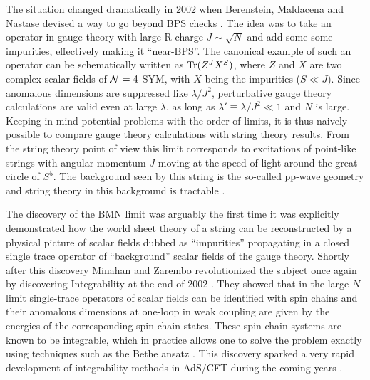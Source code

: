 The situation changed dramatically in 2002 when Berenstein, Maldacena and Nastase devised a way to go beyond BPS checks \cite{Berenstein:2002jq}. 
The idea was to take an operator in gauge theory with large R-charge $J \sim \sqrt{N}$ and add some some impurities, effectively making it ``near-BPS''.
The canonical example of such an operator can be schematically written as $\mathrm{Tr}(Z^J X^S)$, where $Z$ and $X$ are two complex scalar fields of $\mathcal{N}=4$ SYM, with $X$ being the impurities ($S \ll J$).
Since anomalous dimensions are suppressed like $\lambda/J^2$, perturbative gauge theory calculations are valid even at large $\lambda$, as long as $\lambda' \equiv \lambda / J^2 \ll 1$ and $N$ is large.
Keeping in mind potential problems with the order of limits, it is thus naively possible to compare gauge theory calculations with string theory results.
From the string theory point of view this limit corresponds to excitations of point-like strings with angular momentum $J$ moving at the speed of light around the great circle of $S^5$. 
The background seen by this string is the so-called pp-wave geometry \cite{Blau:2001ne} and string theory in this background is tractable \cite{Metsaev:2001bj}.

The discovery of the BMN limit was arguably the first time it was explicitly demonstrated how the world sheet theory of a string can be reconstructed by a physical picture of scalar fields dubbed as ``impurities'' propagating in a closed single trace operator of ``background'' scalar fields of the gauge theory. 
Shortly after this discovery Minahan and Zarembo revolutionized the subject once again by discovering Integrability at the end of 2002 \cite{Minahan:2002ve}.
They showed that in the large $N$ limit single-trace operators of scalar fields can be identified with spin chains and their anomalous dimensions at one-loop in weak coupling are given by the energies of the corresponding spin chain states.
These spin-chain systems are known to be integrable, which in practice allows one to solve the problem exactly using techniques such as the Bethe ansatz \cite{Bethe:1931}. 
This discovery sparked a very rapid development of integrability methods in AdS/CFT during the coming years \cite{Beisert:2010jr}.


